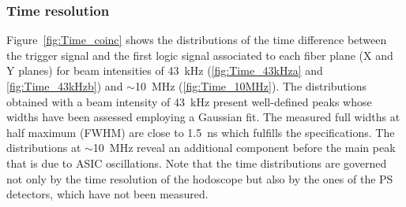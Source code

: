 \documentclass[a4paper,11pt]{article}
\begin{document}
\subsubsection{Time resolution}

Figure~\ref{fig:Time_coinc} shows the distributions of the time difference between the trigger signal and the first logic signal associated to each fiber plane (X and Y planes)  for beam intensities of 43~kHz (\ref{fig:Time_43kHza} and \ref{fig:Time_43kHzb}) and $\sim$10~MHz (\ref{fig:Time_10MHz}). The distributions obtained with a beam intensity of 43~kHz present well-defined peaks whose widths have been assessed employing a Gaussian fit. The measured full widths at half maximum (FWHM) are close to 1.5~ns which fulfills the specifications. The distributions at $\sim$10~MHz reveal an additional component before the main peak that is due to ASIC oscillations. Note that the time distributions are governed not only by the time resolution of the hodoscope but also by the ones of the PS detectors, which have not been measured.
\label{Time_resolution}
\end{document}
